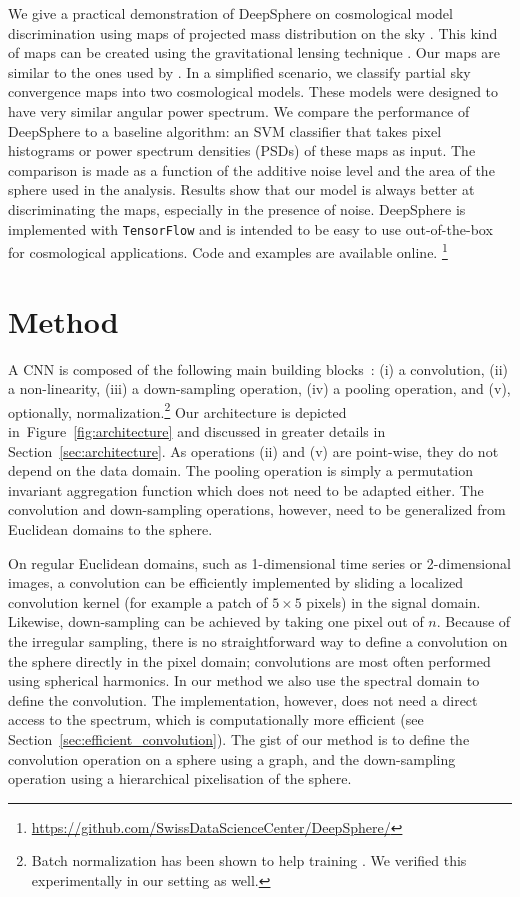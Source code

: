 \documentclass[final,twocolumn,3p,times,sort&compress]{elsarticle}
\newcommand{\figref}[1]{Figure~\ref{fig:#1}}
\newcommand{\secref}[1]{Section~\ref{sec:#1}}
\newcommand{\1}{\b{1}}              %
\newcommand{\0}{\b{0}}              %
\newcommand{\pkg}[1]{\texttt{#1}}
\begin{document}
We give a practical demonstration of DeepSphere on cosmological model discrimination using maps of projected mass distribution on the sky \citep{chang2017curvedsky}.
This kind of maps can be created using the gravitational lensing technique \citep[see][for review]{BartelmannSchneider2001weak}.
Our maps are similar to the ones used by \citep{schmelze2017cosmologicalmodel}.
In a simplified scenario, we classify partial sky convergence maps into two cosmological models.
These models were designed to have very similar angular power spectrum.
We compare the performance of DeepSphere to a baseline algorithm: an SVM classifier that takes pixel histograms or power spectrum densities (PSDs) of these maps as input.
The comparison is made as a function of the additive noise level and the area of the sphere used in the analysis.
Results show that our model is always better at discriminating the maps, especially in the presence of noise.
DeepSphere is implemented with \pkg{TensorFlow} \citep{abadi2016tensorflow} and is intended to be easy to use out-of-the-box for cosmological applications.
Code and examples are available online.{ \footnote{\url{https://github.com/SwissDataScienceCenter/DeepSphere/}}}


\section{Method}
\label{sec:method}

A CNN is composed of the following main building blocks~\citep{lecun1998cnn}:
(i) a convolution,
(ii) a non-linearity,
(iii) a down-sampling operation,
(iv) a pooling operation, and
(v), optionally,  normalization.\footnote{Batch normalization has been shown to help training \citep{ioffe2015batchnorm}. We verified this experimentally in our setting as well.}
Our architecture is depicted in~\figref{architecture} and discussed in greater details in \secref{architecture}. As operations (ii) and (v) are point-wise, they do not depend on the data domain. The pooling operation is simply a permutation invariant aggregation function which does not need to be adapted either. The convolution and down-sampling operations, however, need to be generalized from Euclidean domains to the sphere.

On regular Euclidean domains, such as 1-dimensional time series or 2-dimensional images, a convolution can be efficiently implemented by sliding a localized convolution kernel (for example a patch of $5 \times 5$ pixels) in the signal domain.
Likewise, down-sampling can be achieved by taking one pixel out of $n$.
Because of the irregular sampling, there is no straightforward way to define a convolution on the sphere directly in the pixel domain; convolutions are most often performed using spherical harmonics.
In our method we also use the spectral domain to define the convolution.
The implementation, however, does not need a direct access to the spectrum, which is computationally more efficient (see \secref{efficient_convolution}).
The gist of our method is to define the convolution operation on a sphere using a graph, and the down-sampling operation using a hierarchical pixelisation of the sphere.
\end{document}
